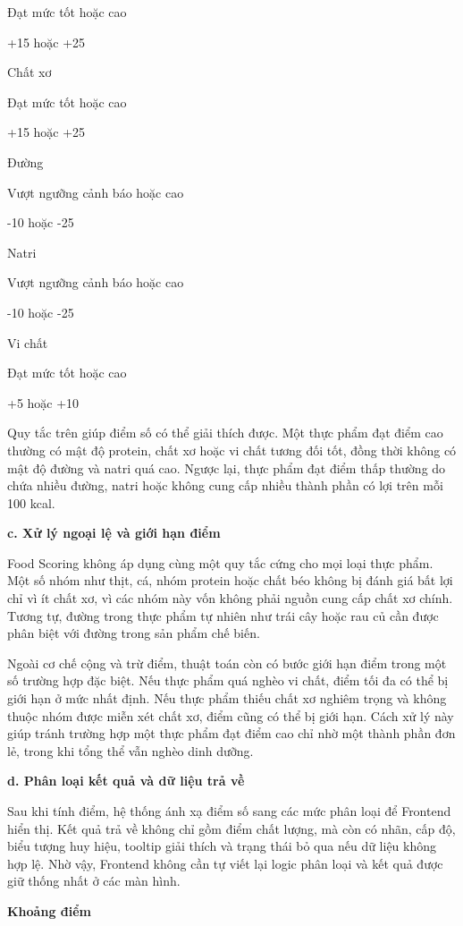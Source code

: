 \documentclass[12pt, a4paper]{report}
\begin{document}
Đạt mức tốt hoặc cao

+15 hoặc +25

Chất xơ

Đạt mức tốt hoặc cao

+15 hoặc +25

Đường

Vượt ngưỡng cảnh báo hoặc cao

-10 hoặc -25

Natri

Vượt ngưỡng cảnh báo hoặc cao

-10 hoặc -25

Vi chất

Đạt mức tốt hoặc cao

+5 hoặc +10

Quy tắc trên giúp điểm số có thể giải thích được. Một thực phẩm đạt điểm cao thường có mật độ protein, chất xơ hoặc vi chất tương đối tốt, đồng thời không có mật độ đường và natri quá cao. Ngược lại, thực phẩm đạt điểm thấp thường do chứa nhiều đường, natri hoặc không cung cấp nhiều thành phần có lợi trên mỗi 100 kcal.

\textbf{c. Xử lý ngoại lệ và giới hạn điểm}

Food Scoring không áp dụng cùng một quy tắc cứng cho mọi loại thực phẩm. Một số nhóm như thịt, cá, nhóm protein hoặc chất béo không bị đánh giá bất lợi chỉ vì ít chất xơ, vì các nhóm này vốn không phải nguồn cung cấp chất xơ chính. Tương tự, đường trong thực phẩm tự nhiên như trái cây hoặc rau củ cần được phân biệt với đường trong sản phẩm chế biến.

Ngoài cơ chế cộng và trừ điểm, thuật toán còn có bước giới hạn điểm trong một số trường hợp đặc biệt. Nếu thực phẩm quá nghèo vi chất, điểm tối đa có thể bị giới hạn ở mức nhất định. Nếu thực phẩm thiếu chất xơ nghiêm trọng và không thuộc nhóm được miễn xét chất xơ, điểm cũng có thể bị giới hạn. Cách xử lý này giúp tránh trường hợp một thực phẩm đạt điểm cao chỉ nhờ một thành phần đơn lẻ, trong khi tổng thể vẫn nghèo dinh dưỡng.

\textbf{d. Phân loại kết quả và dữ liệu trả về}

Sau khi tính điểm, hệ thống ánh xạ điểm số sang các mức phân loại để Frontend hiển thị. Kết quả trả về không chỉ gồm điểm chất lượng, mà còn có nhãn, cấp độ, biểu tượng huy hiệu, tooltip giải thích và trạng thái bỏ qua nếu dữ liệu không hợp lệ. Nhờ vậy, Frontend không cần tự viết lại logic phân loại và kết quả được giữ thống nhất ở các màn hình.

\textbf{Khoảng điểm}
\end{document}
